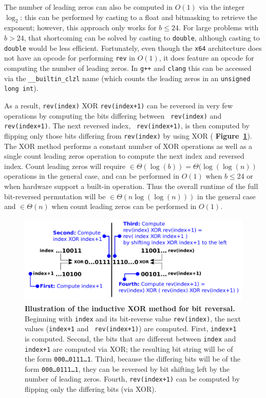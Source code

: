 \documentclass[10pt]{article}
\begin{document}
The number of leading zeros can also be computed in $O(1)$ via the
integer $\log_2$: this can be performed by casting to a float and
bitmasking to retrieve the exponent; however, this approach only works
for $b \leq 24$\cite{anderson:bit}. For large problems with $b > 24$,
that shortcoming can be solved by casting to {\tt double}, although
casting to {\tt double} would be less efficient. Fortunately, even
though the {\tt x64} architecture does not have an opcode for
performing {\tt rev} in $O(1)$, it does feature an opcode for
computing the number of leading zeros. In {\tt g++} and {\tt clang}
this can be accessed via the {\tt \_\_builtin\_clzl} name (which
counts the leading zeros in an {\tt unsigned long int}).

As a result, {\tt rev(index)} XOR {\tt rev(index+1)} can be reversed
in very few operations by computing the bits differing between {\tt
  rev(index)} and {\tt rev(index+1)}. The next reversed index, {\tt
  rev(index+1)}, is then computed by flipping only those bits
differing from {\tt rev(index)} by using XOR ({\bf
  Figure~\ref{figure:xor}}). The XOR method performs a constant number
of XOR operations as well as a single count leading zeros operation to
compute the next index and reversed index. Count leading zeros will
require $\in \Theta(\log(b)) = \Theta(\log(\log(n))$ operations in the
general case, and can be performed in $O(1)$ when $b \leq 24$ or when
hardware support a built-in operation. Thus the overall runtime of the
full bit-reversed permutation will be $\in \Theta(n \log(\log(n)))$ in
the general case and $\in \Theta(n)$ when count leading zeros can be
performed in $O(1)$.

\begin{figure}
\centering
\includegraphics[width=6in]{cartoons/xor.pdf}
\caption{{\bf Illustration of the inductive XOR method for bit
    reversal.} Beginning with {\tt index} and its bit-reverse value
  {\tt rev(index)}, the next values ({\tt index+1} and {\tt
    rev(index+1)}) are computed. First, {\tt index+1} is
  computed. Second, the bits that are different between {\tt index}
  and {\tt index+1} are computed via XOR; the resulting bit string
  will be of the form {\tt 000\ldots 0111\ldots 1}. Third, because the
  differing bits will be of the form {\tt 000\ldots 0111\ldots 1},
  they can be reversed by bit shifting left by the number of leading
  zeros. Fourth, {\tt rev(index+1)} can be computed by flipping only
  the differing bits (via XOR). 
  \label{figure:xor}}
\end{figure}
\end{document}
